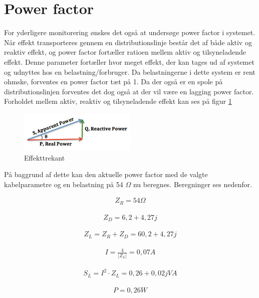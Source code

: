 \section{Power factor}

For yderligere monitorering ønskes det også at undersøge power factor i systemet. Når effekt transporteres gennem en distributionslinje består det af både aktiv og reaktiv effekt, og power factor fortæller ratioen mellem aktiv og tilsyneladende effekt. Denne parameter fortæller hvor meget effekt, der kan tages ud af systemet og udnyttes hos en belastning/forbruger. Da belastningerne i dette system er rent ohmske, forventes en power factor tæt på 1. Da der også er en spole på distributionslinjen forventes det dog også at der vil være en lagging power factor. Forholdet mellem aktiv, reaktiv og tilsyneladende effekt kan ses på figur \ref{fig:Effekttrekant}

\begin{figure}[H] 
	\centering
	\includegraphics[width=0.5\textwidth]{Figure/Effekttrekant}
	\caption{Effekttrekant}
	\label{fig:Effekttrekant}
\end{figure}

På baggrund af dette kan den aktuelle power factor med de valgte kabelparametre og en belastning på 54 $\Omega$ nu beregnes. Beregninger ses nedenfor.

\begin{align}
Z_R=54 \Omega
\end{align}

\begin{align}
Z_D=6,2+4,27j
\end{align}

\begin{align}
Z_L=Z_R+Z_D=60,2+4,27j
\end{align}

\begin{align}
I=\frac{4}{\vert Z_L \vert} = 0,07 A
\end{align}

\begin{align}
S_L=I^2\cdot Z_L = 0,26+0,02j VA
\end{align}

\begin{align}
P=0,26 W
\end{align}

